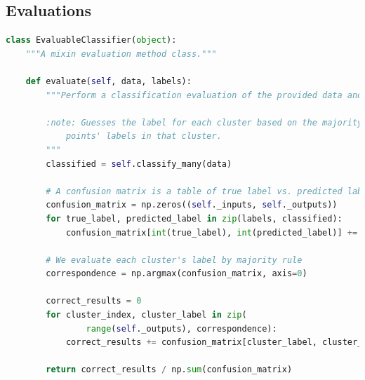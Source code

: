 \documentclass[a4paper, 11pt, twocolumn, final]{article} %
\begin{document}
\subsection{Evaluations}
\begin{lstlisting}[language=Python, style=python]
class EvaluableClassifier(object):
    """A mixin evaluation method class."""

    def evaluate(self, data, labels):
        """Perform a classification evaluation of the provided data and labels.

        :note: Guesses the label for each cluster based on the majority of
            points' labels in that cluster.
        """
        classified = self.classify_many(data)

        # A confusion matrix is a table of true label vs. predicted label.
        confusion_matrix = np.zeros((self._inputs, self._outputs))
        for true_label, predicted_label in zip(labels, classified):
            confusion_matrix[int(true_label), int(predicted_label)] += 1

        # We evaluate each cluster's label by majority rule
        correspondence = np.argmax(confusion_matrix, axis=0)

        correct_results = 0
        for cluster_index, cluster_label in zip(
                range(self._outputs), correspondence):
            correct_results += confusion_matrix[cluster_label, cluster_index]

        return correct_results / np.sum(confusion_matrix)
\end{lstlisting}
\end{document}
